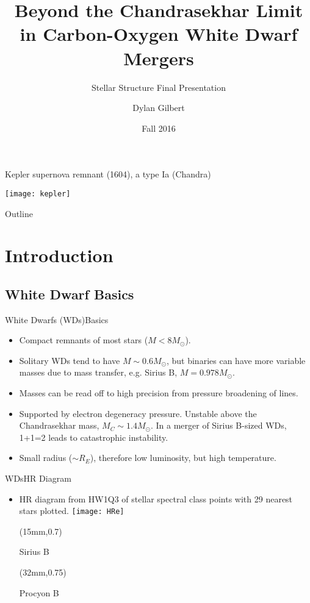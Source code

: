 \documentclass{beamer}
\title{Beyond the Chandrasekhar Limit in Carbon-Oxygen White Dwarf Mergers}
\subtitle{Stellar Structure Final Presentation}
\author{Dylan Gilbert}
\institute[University of California, San Diego]
\date{Fall 2016}
\begin{document}
\begin{frame}
\titlepage
\end{frame}

\begin{frame}{Kepler supernova remnant (1604), a type Ia (Chandra)}
\begin{center}\texttt{[image: kepler]}\end{center}
\end{frame}

\begin{frame}{Outline}
\tableofcontents
\end{frame}

\section{Introduction}

\subsection{White Dwarf Basics}

\begin{frame}{White Dwarfs (WDs)}{Basics}
  \begin{itemize}
  \item {Compact remnants of most stars ($M< 8M_{\odot}$).}
  \item {Solitary WDs tend to have $M\sim 0.6M_{\odot}$, but binaries can have more variable masses due to mass transfer, e.g. Sirius B, $M=0.978M_{\odot}$.}
  \item {Masses can be read off to high precision from pressure broadening of lines.}
  \item {Supported by electron degeneracy pressure. Unstable above the Chandrasekhar mass, $M_{C} \sim 1.4M_{\odot}$. In a merger of Sirius B-sized WDs, 1+1=2 leads to catastrophic instability.}
  \item {Small radius ($\sim$$R_E$), therefore low luminosity, but high temperature.}     
  \end{itemize}
\end{frame}

\begin{frame}{WDs}{HR Diagram}
\begin{itemize}
\item HR diagram from HW1Q3 of stellar spectral class points with 29 nearest stars plotted.
\texttt{[image: HRe]}
\begin{textblock*}{64mm}(15mm,0.7\textheight)
\begin{exampleblock}{}
  Sirius B
\end{exampleblock}
\end{textblock*}

\begin{textblock*}{64mm}(32mm,0.75\textheight)
\begin{exampleblock}{}
  Procyon B
\end{exampleblock}
\end{textblock*}
\end{itemize}
\end{frame}
\end{document}
